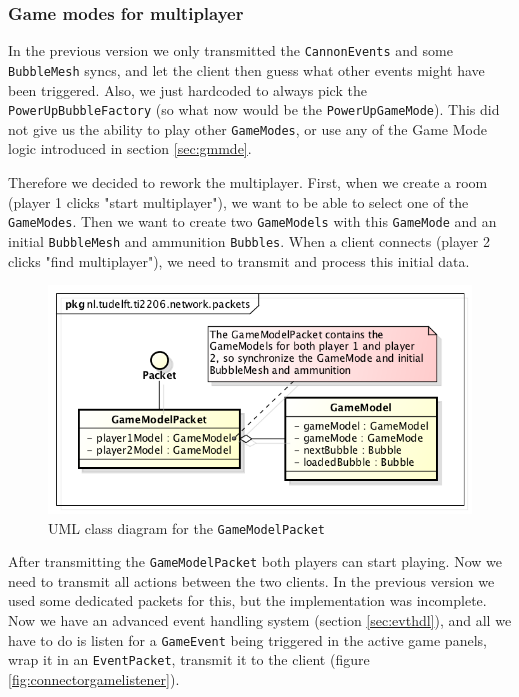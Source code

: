 \documentclass[a4paper]{article}
\begin{document}
\subsubsection{Game modes for multiplayer}
In the previous version we only transmitted the \texttt{CannonEvents} and some \texttt{BubbleMesh} syncs, and let the client then guess what other events might have been triggered. Also, we just hardcoded to always pick the \texttt{PowerUpBubbleFactory} (so what now would be the \texttt{PowerUpGameMode}). This did not give us the ability to play other \texttt{GameModes}, or use any of the Game Mode logic introduced in section \ref{sec:gmmde}.

\par{}Therefore we decided to rework the multiplayer. First, when we create a room (player 1 clicks "start multiplayer"), we want to be able to select one of the \texttt{GameModes}. Then we want to create two \texttt{GameModels} with this \texttt{GameMode} and an initial \texttt{BubbleMesh} and ammunition \texttt{Bubbles}. When a client connects (player 2 clicks "find multiplayer"), we need to transmit and process this initial data.

\begin{figure}[H]
	\centering
	\includegraphics[scale=0.5]{GameModelPacket.png}
    \caption{UML class diagram for the \texttt{GameModelPacket} }
    \label{fig:gmpacket}
\end{figure}

After transmitting the \texttt{GameModelPacket} both players can start playing. Now we need to transmit all actions between the two clients. In the previous version we used some dedicated packets for this, but the implementation was incomplete. Now we have an advanced event handling system (section \ref{sec:evthdl}), and all we have to do is listen for a \texttt{GameEvent} being triggered in the active game panels, wrap it in an \texttt{EventPacket}, transmit it to the client (figure \ref{fig:connectorgamelistener}).
\end{document}
